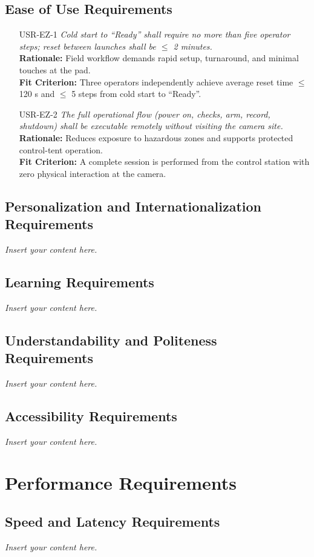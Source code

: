 \documentclass[12pt]{article}
\newcommand{\lips}{\textit{Insert your content here.}}
\begin{document}
\subsection{Ease of Use Requirements}
\begin{itemize}[leftmargin=*]
  \item[USR-EZ-1] \emph{Cold start to “Ready” shall require no more than five operator steps; reset between launches shall be $\leq$ 2 minutes.}\\
  \textbf{Rationale:} Field workflow demands rapid setup, turnaround, and minimal touches at the pad.\\
  \textbf{Fit Criterion:} Three operators independently achieve average reset time $\leq$ 120 s and $\leq$ 5 steps from cold start to “Ready”.

  \item[USR-EZ-2] \emph{The full operational flow (power on, checks, arm, record, shutdown) shall be executable remotely without visiting the camera site.}\\
  \textbf{Rationale:} Reduces exposure to hazardous zones and supports protected control-tent operation.\\
  \textbf{Fit Criterion:} A complete session is performed from the control station with zero physical interaction at the camera.
\end{itemize}
\subsection{Personalization and Internationalization Requirements}
\lips
\subsection{Learning Requirements}
\lips
\subsection{Understandability and Politeness Requirements}
\lips
\subsection{Accessibility Requirements}
\lips

\section{Performance Requirements}
\subsection{Speed and Latency Requirements}
\lips
\end{document}
